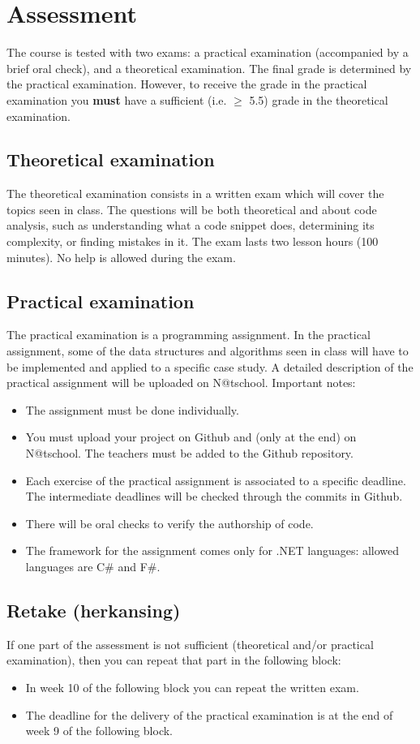 \section{Assessment}
	The course is tested with two exams: a practical examination (accompanied by a brief oral check), and a theoretical examination. The final grade is determined by the practical examination. However, to receive the grade in the practical examination you \textbf{must} have a sufficient (i.e. $\geq$ 5.5) grade in the theoretical examination.

	\subsection{Theoretical examination}
		The theoretical examination consists in a written exam which will cover the topics seen in class. The questions will be both theoretical and about code analysis, such as understanding what a code snippet does, determining its complexity, or finding mistakes in it.
		The exam lasts two lesson hours (100 minutes). No help is allowed during the exam.

	\subsection{Practical examination}
	The practical examination is a programming assignment. In the practical assignment, some of the data structures and algorithms seen in class will have to be implemented and applied to a specific case study. A detailed description of the practical assignment will be uploaded on N@tschool. Important notes:
	\begin{itemize}
	\item The assignment must be done individually.
	\item You must upload your project on Github and (only at the end) on N@tschool. The teachers must be added to the Github repository. 
	\item Each exercise of the practical assignment is associated to a specific deadline. The intermediate deadlines will be checked through the commits in Github.
	\item There will be oral checks to verify the authorship of code.
	\item The framework for the assignment comes only for .NET languages: allowed languages are C\# and F\#.
	\end{itemize}
	
	\subsection{Retake (herkansing)}
	If one part of the assessment is not sufficient (theoretical and/or practical examination), then you can repeat that part in the following block:
	\begin{itemize}
	\item In week 10 of the following block you can repeat the written exam.
	\item The deadline for the delivery of the practical examination is at the end of week 9 of the following block.
	\end{itemize}
	
